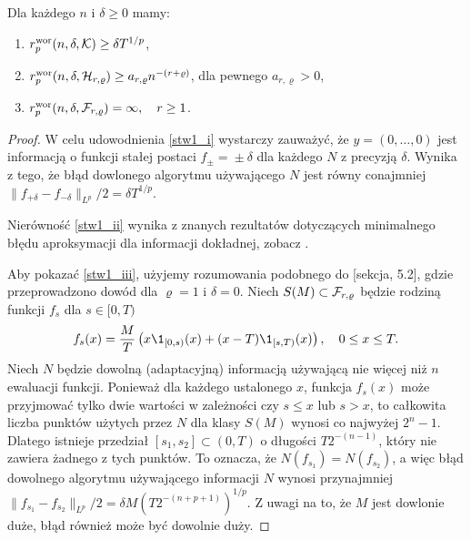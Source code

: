 \documentclass[oik, pdftex, robocza, man]{mgrwms}
\begin{document}
    \begin{stw} \label{stw1}
        Dla każdego $n$ i $\delta \geq 0$ mamy:
        \begin{enumerate}[label=(\roman*)]
            \item \label{stw1_i} $r^{\mathrm{wor}}_{p}(n, \delta, \mathcal{K}) \geq \delta T^{1/p}$,
            \item \label{stw1_ii} $r^{\mathrm{wor}}_{p}(n, \delta, \mathcal{H}_{r,\varrho}) \geq a_{r,\varrho}n^{-(r + \varrho)}$, dla pewnego $a_{r,\varrho} > 0$,
            \item \label{stw1_iii} $r^{\mathrm{wor}}_{p}(n, \delta, \mathcal{F}_{r,\varrho}) = \infty, \quad r \geq 1$.
        \end{enumerate}
    \end{stw}
    \begin{proof}
        W celu udowodnienia \ref{stw1_i} wystarczy zauważyć, że $y = (0, \ldots, 0)$ jest informacją o funkcji stałej postaci $f_{\pm} \!=\! \pm \delta$ dla każdego $N$ z precyzją $\delta$. Wynika z tego, że błąd dowlonego algorytmu używającego $N$ jest równy conajmniej $\| f_{+\delta} - f_{-\delta} \|_{L^{p}} / 2 = \delta T^{1/p}$.

        Nierówność \ref{stw1_ii} wynika z znanych rezultatów dotyczących minimalnego błędu aproksymacji dla informacji dokładnej, zobacz \cite{DaS}.

        Aby pokazać \ref{stw1_iii}, użyjemy rozumowania podobnego do \cite{PoA} [sekcja, 5.2], gdzie przeprowadzono dowód dla $\varrho = 1$ i $\delta = 0$. Niech $S(M) \subset \mathcal{F}_{r, \varrho}$ będzie rodziną funkcji $f_{s}$ dla $s \in [0, T)$
        \begin{equation*}
            f_{s}(x) = \frac{M}{T}\left( x\1_{[0,s)}(x) + (x-T)\1_{[s,T)}(x) \right), \quad 0 \leq x \leq T.
        \end{equation*}
        Niech $N$ będzie dowolną (adaptacyjną) informacją używającą nie więcej niż $n$ ewaluacji funkcji. Ponieważ dla każdego ustalonego $x$, funkcja $f_{s}(x)$ może przyjmować tylko dwie wartości w zależności czy $s \leq x$ lub $s > x$, to całkowita liczba punktów użytych przez $N$ dla klasy $S(M)$ wynosi co najwyżej $2^{n}-1$. Dlatego istnieje przedział $[s_{1}, s_{2}] \subset (0,T)$ o długości $T 2^{-(n-1)}$, który nie zawiera żadnego z tych punktów. To oznacza, że  $N(f_{s_{1}}) = N(f_{s_{2}})$, a więc błąd dowolnego algorytmu używającego informacji $N$ wynosi przynajmniej $\| f_{s_{1}} - f_{s_{2}} \|_{L^{p}} / 2 = \delta M(T 2^{-(n+p+1)})^{1/p}$. Z uwagi na to, że $M$ jest dowlonie duże, błąd również może być dowolnie duży.
    \end{proof}
\end{document}

